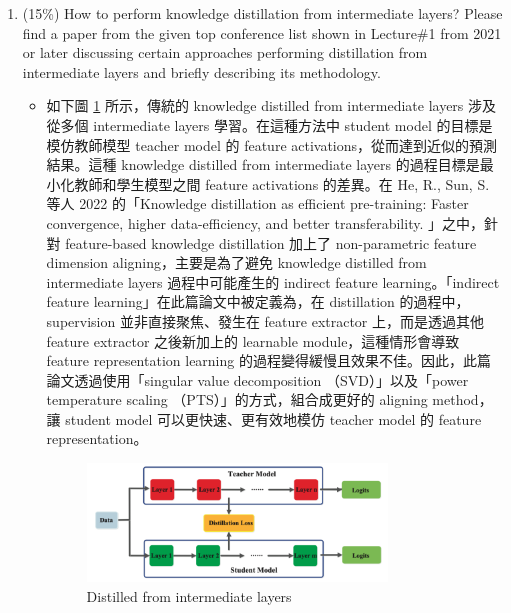 \documentclass[10pt,a4paper]{article}
\begin{document}
\begin{enumerate}
\begin{itemize}
\end{itemize}


\item (15\%) How to perform knowledge distillation from intermediate layers? Please find a paper from the given top conference list shown in Lecture\#1 from 2021 or later discussing certain approaches performing distillation from intermediate layers and briefly describing its methodology.
\begin{itemize}
\item 如下圖 \ref{fig:Distillation_intermediate} 所示，傳統的 knowledge distilled from intermediate layers 涉及從多個 intermediate layers 學習。在這種方法中 student model 的目標是模仿教師模型 teacher model 的 feature activations，從而達到近似的預測結果。這種 knowledge distilled from intermediate layers 的過程目標是最小化教師和學生模型之間 feature activations 的差異。在 He, R., Sun, S. 等人 2022 的「Knowledge distillation as efficient pre-training: Faster convergence, higher data-efficiency, and better transferability. 」之中，針對 feature-based knowledge distillation 加上了 non-parametric feature dimension aligning，主要是為了避免 knowledge distilled from intermediate layers 過程中可能產生的 indirect feature learning。「indirect feature learning」在此篇論文中被定義為，在 distillation 的過程中，supervision 並非直接聚焦、發生在 feature extractor 上，而是透過其他 feature extractor 之後新加上的 learnable module，這種情形會導致 feature representation learning 的過程變得緩慢且效果不佳。因此，此篇論文透過使用「singular value decomposition （SVD）」以及「power temperature scaling （PTS）」的方式，組合成更好的 aligning method，讓 student model 可以更快速、更有效地模仿 teacher model 的 feature representation。

\begin{figure}[hbt]
\centering
\includegraphics[width=0.8\textwidth]{Distillation_intermediate.png}
\caption{Distilled from intermediate layers}
\label{fig:Distillation_intermediate}
\end{figure}

\end{itemize}


\end{enumerate}
\end{document}

